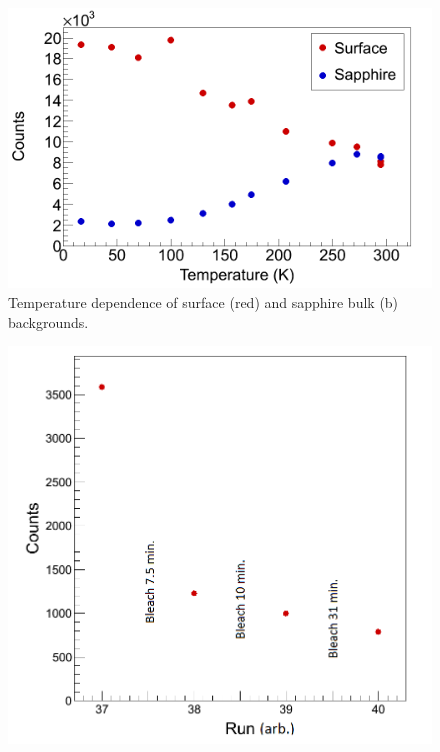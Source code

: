 



\begin{figure} %
        \centering
                \includegraphics[width=.6\textwidth]{figures/bg_temp_dep.png}
                \caption{Temperature dependence of surface (red) and sapphire bulk (b) backgrounds.}
\label{fig:BGtempDependence}
\end{figure}

\begin{figure} %
        \centering
                \includegraphics[width=.4\textwidth]{figures/Bleach_SurfaceBG_20150807_part1.png}
                \caption{}
\label{fig:surfBGbleach}
\end{figure}

